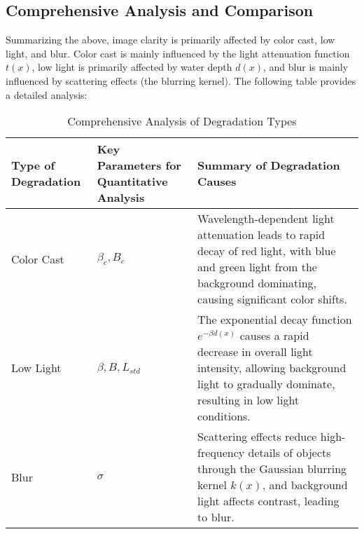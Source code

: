 \documentclass[11pt]{ctexart}
\begin{document}
    \subsection{Comprehensive Analysis and Comparison}
    Summarizing the above, image clarity is primarily affected by color cast, low light, and blur.
    Color cast is mainly influenced by the light attenuation function \( t(x) \), low light is primarily affected by water depth \( d(x) \),
    and blur is mainly influenced by scattering effects (the blurring kernel). The following table provides a detailed analysis:

    \begin{table}[ht]
    \centering
    \begin{tabularx}{\textwidth}{|>{\centering\arraybackslash}X|>{\centering\arraybackslash}X|>{\centering\arraybackslash}X|}
    \hline
    \textbf{Type of Degradation} & \textbf{Key Parameters for Quantitative Analysis} & \textbf{Summary of Degradation Causes} \\ \hline
    Color Cast & $\beta_c, B_c$ & Wavelength-dependent light attenuation leads to rapid decay of red light, with blue and green light from the background dominating, causing significant color shifts. \\ \hline
    Low Light & $\beta, B, L_{std}$ & The exponential decay function $e^{-\beta d(x)}$ causes a rapid decrease in overall light intensity, allowing background light to gradually dominate, resulting in low light conditions. \\ \hline
    Blur & $\sigma$ & Scattering effects reduce high-frequency details of objects through the Gaussian blurring kernel $k(x)$, and background light affects contrast, leading to blur. \\ \hline
    \end{tabularx}
    \caption{Comprehensive Analysis of Degradation Types}
    \end{table}
\end{document}
